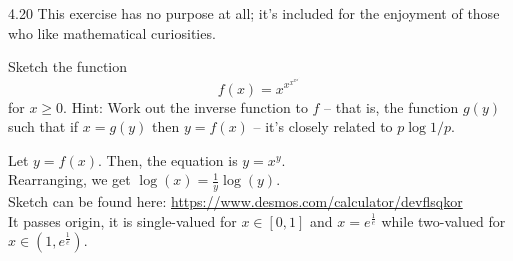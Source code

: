 \documentclass[12pt, a4paper]{article}
\begin{document}
\begin{prob}{4.20}
    This exercise has no purpose at all; it's included for the enjoyment of those who like mathematical curiosities.

\vspace{0.5em}
\noindent Sketch the function
\begin{equation}\tag{4.44}
f(x) = x^{x^{x^{x^{x^{\cdot^{\cdot^{\cdot}}}}}}}
\end{equation}
for $x \ge 0$. Hint: Work out the inverse function to $f$ -- that is, the function $g(y)$ such that if $x = g(y)$ then $y = f(x)$ -- it's closely related to $p \log 1/p$.
\end{prob}
\begin{sol}
    Let $y = f(x)$. Then, the equation is $y = x^y$. \\
    Rearranging, we get $\log(x) = \frac{1}{y} \log(y)$. \\
    Sketch can be found here: \href{https://www.desmos.com/calculator/devflsqkor}{https://www.desmos.com/calculator/devflsqkor} \\
    It passes origin, it is single-valued for $x \in [0, 1]$ and $x = e^{\frac{1}{e}}$ while two-valued for $x \in (1, e^{\frac{1}{e}})$.
\end{sol}
\bigskip
\end{document}
